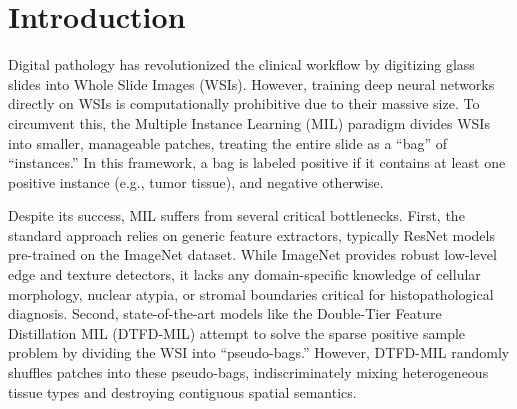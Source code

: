 \documentclass[12pt, a4paper]{article}
\begin{document}
\begin{abstract}
\noindent Whole Slide Images (WSIs) present a unique challenge in computational pathology due to their gigapixel resolution and the sparse, localized nature of critical pathological features such as micro-metastases. Multiple Instance Learning (MIL) has emerged as the de facto paradigm for analyzing WSIs, yet traditional MIL frameworks often struggle with noisy patch bags and rely on generic, non-domain-specific feature extractors like ImageNet-pretrained ResNet-50. In this final assignment, we extend the Double-Tier Feature Distillation MIL (DTFD-MIL) architecture by introducing two state-of-the-art foundation models. First, we replace the standard ResNet-50 visual features with 512-dimensional embeddings generated by Pathology Language-Image Pretraining (PLIP), aligning visual features directly with medical text semantics. Second, we replace the baseline's random pseudo-bag splitting logic with a novel Spatially-Aware Semantic Clustering algorithm guided by Meta's Segment Anything Model (SAM). Due to extreme computational constraints on local hardware, experiments were heavily restricted to a miniature 1,000-image subset (50 bags) of the PatchCamelyon (PCam) dataset. Despite severe underfitting caused by data starvation, empirical results demonstrate that the integration of domain-specific embeddings and semantic clustering still achieves a remarkable $+0.208$ absolute improvement in Area Under the ROC Curve (AUC) compared to the baseline, achieving a final test AUC of 0.760.
\end{abstract}

\newpage
\tableofcontents
\newpage

\section{Introduction}
Digital pathology has revolutionized the clinical workflow by digitizing glass slides into Whole Slide Images (WSIs). However, training deep neural networks directly on WSIs is computationally prohibitive due to their massive size. To circumvent this, the Multiple Instance Learning (MIL) paradigm divides WSIs into smaller, manageable patches, treating the entire slide as a ``bag'' of ``instances.'' In this framework, a bag is labeled positive if it contains at least one positive instance (e.g., tumor tissue), and negative otherwise.

Despite its success, MIL suffers from several critical bottlenecks. First, the standard approach relies on generic feature extractors, typically ResNet models pre-trained on the ImageNet dataset. While ImageNet provides robust low-level edge and texture detectors, it lacks any domain-specific knowledge of cellular morphology, nuclear atypia, or stromal boundaries critical for histopathological diagnosis. Second, state-of-the-art models like the Double-Tier Feature Distillation MIL (DTFD-MIL) attempt to solve the sparse positive sample problem by dividing the WSI into ``pseudo-bags.'' However, DTFD-MIL randomly shuffles patches into these pseudo-bags, indiscriminately mixing heterogeneous tissue types and destroying contiguous spatial semantics.
\end{document}
